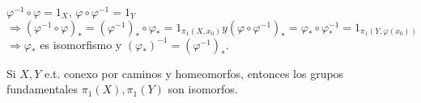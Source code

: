 \begin{dem}
  $\varphi^{-1} \circ \varphi = 1_{X}$, $\varphi \circ \varphi^{-1} = 1_{Y}$
  \[ 
    \Rightarrow (\varphi^{-1} \circ \varphi)_* = (\varphi^{-1})_* \circ \varphi_* = 1_{\pi_{1}(X, x_{0})}  y (\varphi \circ \varphi^{-1})_* = \varphi_* \circ \varphi^{-1}_* = 1_{\pi_{1}(Y, \varphi(x_{0}))}
  \] 
  $\Rightarrow \varphi_*$ es isomorfismo y $(\varphi_*)^{-1} = (\varphi^{-1})_*$.
\end{dem}

\begin{cor}
  Si $X, Y$ e.t. conexo por caminos y homeomorfos, entonces los grupos fundamentales $\pi_{1}(X), \pi_{1}(Y)$ son isomorfos.
\end{cor}
